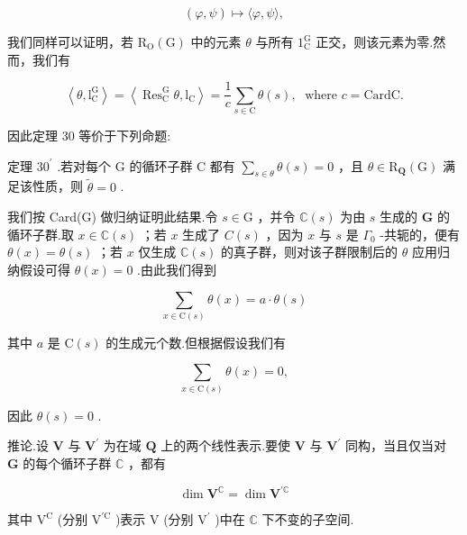 \documentclass[10pt]{article}
\begin{document}
\[
\left( {\varphi ,\psi }\right)  \mapsto  \langle \varphi ,\psi \rangle ,
\]

我们同样可以证明，若 \({\mathrm{R}}_{\mathrm{O}}\left( \mathrm{G}\right)\) 中的元素 \(\theta\) 与所有 \({1}_{\mathrm{C}}^{\mathrm{G}}\) 正交，则该元素为零.然而，我们有

\[
\left\langle  {\theta ,{\mathrm{l}}_{\mathrm{C}}^{\mathrm{G}}}\right\rangle   = \left\langle  {{\operatorname{Res}}_{\mathrm{C}}^{\mathrm{G}}\theta ,{\mathrm{l}}_{\mathrm{C}}}\right\rangle   = \frac{1}{c}\mathop{\sum }\limits_{{s \in  \mathrm{C}}}\theta \left( s\right) ,\;\text{ where }c = \mathrm{{Card}}\mathrm{C}.
\]

因此定理 30 等价于下列命题:

定理 \({30}^{\prime }\) .若对每个 \(\mathrm{G}\) 的循环子群 \(\mathrm{C}\) 都有 \(\mathop{\sum }\limits_{{s \in  \theta }}\theta \left( s\right)  = 0\) ，且 \(\theta  \in  {\mathrm{R}}_{\mathbf{Q}}\left( \mathrm{G}\right)\) 满足该性质，则 \(\widetilde{\theta } = 0\) .

我们按 Card(G) 做归纳证明此结果.令 \(s \in  \mathrm{G}\) ，并令 \(\mathbb{C}\left( s\right)\) 为由 \(s\) 生成的 \(\mathbf{G}\) 的循环子群.取 \(x \in  \mathbb{C}\left( s\right)\) ；若 \(x\) 生成了 \(C\left( s\right)\) ，因为 \(x\) 与 \(s\) 是 \({\Gamma }_{0}\) -共轭的，便有 \(\theta \left( x\right)  = \theta \left( s\right)\) ；若 \(x\) 仅生成 \(\mathbb{C}\left( s\right)\) 的真子群，则对该子群限制后的 \(\theta\) 应用归纳假设可得 \(\theta \left( x\right)  = 0\) .由此我们得到

\[
\mathop{\sum }\limits_{{x \in  \mathrm{C}\left( s\right) }}\theta \left( x\right)  = a \cdot  \theta \left( s\right)
\]

其中 \(a\) 是 \(\mathrm{C}\left( s\right)\) 的生成元个数.但根据假设我们有

\[
\mathop{\sum }\limits_{{x \in  \mathrm{C}\left( s\right) }}\theta \left( x\right)  = 0,
\]

因此 \(\theta \left( s\right)  = 0\) .

推论.设 \(\mathbf{V}\) 与 \({\mathbf{V}}^{\prime }\) 为在域 \(\mathbf{Q}\) 上的两个线性表示.要使 \(\mathbf{V}\) 与 \({\mathbf{V}}^{\prime }\) 同构，当且仅当对 \(\mathbf{G}\) 的每个循环子群 \(\mathbb{C}\) ，都有

\[
\dim {\mathbf{V}}^{\mathbb{C}} = \dim {\mathbf{V}}^{\prime \mathbb{C}}
\]

其中 \({\mathrm{V}}^{\mathrm{C}}\) (分别 \({\mathrm{V}}^{\prime \mathrm{C}}\) )表示 \(\mathrm{V}\) (分别 \({\mathrm{V}}^{\prime }\) )中在 \(\mathbb{C}\) 下不变的子空间.
\end{document}

